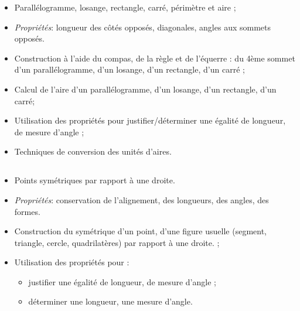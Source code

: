 \savoir
\begin{itemize}
\item Parallélogramme, losange, rectangle, carré, périmètre et aire ;
\item \textit{Propriétés}: longueur des côtés opposés, diagonales, angles aux sommets opposés.
\end{itemize}
\savoirfaire
\begin{itemize}
\item Construction à l'aide du compas, de la règle et de l'équerre : du 4ème sommet d'un parallélogramme, d'un losange, d'un rectangle, d'un carré ;
\item Calcul de l'aire d'un parallélogramme, d'un losange, d'un rectangle, d'un carré;
\item Utilisation des propriétés pour justifier/déterminer une égalité de longueur, de mesure d'angle ;
\item  Techniques de conversion des unités d'aires.
\end{itemize}

\subsection*{}

\savoir
\begin{itemize}
\item Points symétriques par rapport à une droite.
\item \textit{Propriétés}: conservation de l'alignement, des longueurs, des angles, des formes.
\end{itemize}
\savoirfaire
\begin{itemize}
\item Construction du symétrique d'un point, d'une figure usuelle (segment, triangle, cercle, quadrilatères) par rapport à une droite. ;
\item  Utilisation des propriétés pour :
\begin{itemize}
\item justifier une égalité de longueur, de mesure d'angle ; 
\item déterminer une longueur, une mesure d'angle.
\end{itemize}  
\end{itemize}

\subsection*{}

